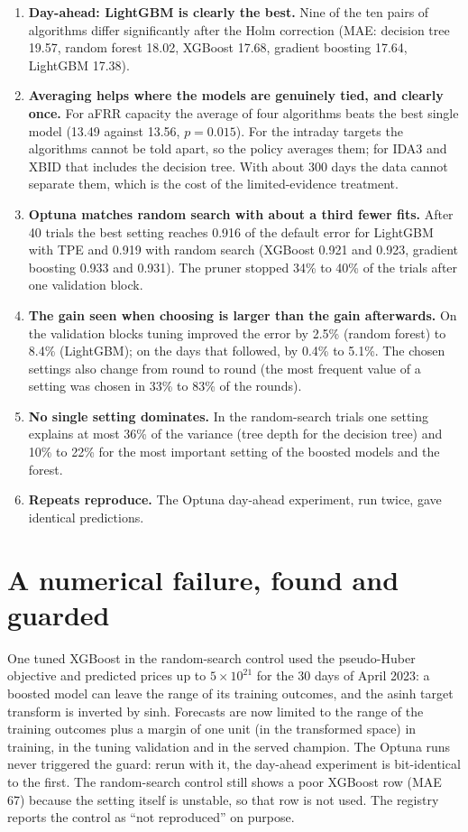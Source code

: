 \documentclass[11pt,a4paper]{article}
\begin{document}
\begin{enumerate}
\item \textbf{Day-ahead: LightGBM is clearly the best.} Nine of the ten pairs of algorithms differ significantly after the
      Holm correction (MAE: decision tree 19.57, random forest 18.02, XGBoost 17.68, gradient boosting 17.64, LightGBM 17.38).
\item \textbf{Averaging helps where the models are genuinely tied, and clearly once.} For aFRR capacity the average of four
      algorithms beats the best single model (13.49 against 13.56, $p=0.015$). For the intraday targets the algorithms cannot be
      told apart, so the policy averages them; for IDA3 and XBID that includes the decision tree. With about 300 days the data
      cannot separate them, which is the cost of the limited-evidence treatment.
\item \textbf{Optuna matches random search with about a third fewer fits.} After 40 trials the best setting reaches 0.916 of
      the default error for LightGBM with TPE and 0.919 with random search (XGBoost 0.921 and 0.923, gradient boosting 0.933
      and 0.931). The pruner stopped 34\% to 40\% of the trials after one validation block.
\item \textbf{The gain seen when choosing is larger than the gain afterwards.} On the validation blocks tuning improved the
      error by 2.5\% (random forest) to 8.4\% (LightGBM); on the days that followed, by 0.4\% to 5.1\%. The chosen settings also
      change from round to round (the most frequent value of a setting was chosen in 33\% to 83\% of the rounds).
\item \textbf{No single setting dominates.} In the random-search trials one setting explains at most 36\% of the variance
      (tree depth for the decision tree) and 10\% to 22\% for the most important setting of the boosted models and the forest.
\item \textbf{Repeats reproduce.} The Optuna day-ahead experiment, run twice, gave identical predictions.
\end{enumerate}

\section{A numerical failure, found and guarded}

One tuned XGBoost in the random-search control used the pseudo-Huber objective and predicted prices up to $5\times10^{21}$ for
the 30 days of April 2023: a boosted model can leave the range of its training outcomes, and the asinh target transform is
inverted by sinh. Forecasts are now limited to the range of the training outcomes plus a margin of one unit (in the transformed
space) in training, in the tuning validation and in the served champion. The Optuna runs never triggered the guard: rerun
with it, the day-ahead experiment is bit-identical to the first. The random-search control still shows a poor XGBoost row
(MAE 67) because the setting itself is unstable, so that row is not used. The registry reports the control as ``not
reproduced'' on purpose.
\end{document}
